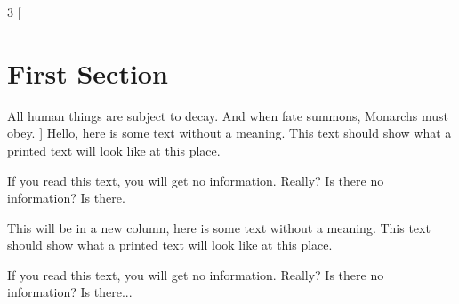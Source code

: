 \documentclass{article}
\begin{document}
	
	\begin{multicols}{3}
		[
		\section{First Section}
		All human things are subject to decay. And when fate summons, Monarchs must obey.
		]
		Hello, here is some text without a meaning.  This text should show what 
		a printed text will look like at this place.
		
		If you read this text, you will get no information.  Really?  Is there 
		no information?  Is there.
		
		\columnbreak
		\blindtext
		This will be in a new column, here is some text without a meaning.  This text 
		should show what a printed text will look like at this place.
		
		If you read this text, you will get no information.  Really?  Is there 
		no information?  Is there...
	\end{multicols}
	
	\blindtext
	
\end{document}
